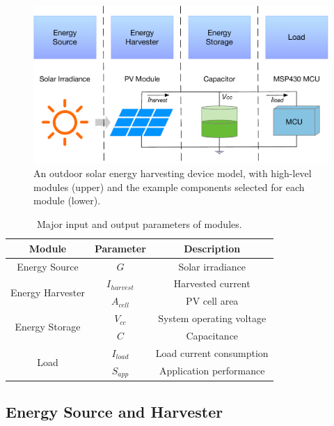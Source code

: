 \begin{figure}[H]
    \centering
    \includegraphics[width=15cm]{figure/work1/framework}
    \caption{An outdoor solar energy harvesting device model, with high-level modules (upper) and the example components selected for each module (lower).}
    \label{Figure:framework}
\end{figure}

\begin{table}[H]
\caption{Major input and output parameters of modules.}
\label{Table:parameter}
\centering
\begin{tabular}{ccc}
\toprule
\textbf{Module}	& \textbf{Parameter} & \textbf{Description} \\
\midrule
Energy Source & $G$ & Solar irradiance \\
\midrule
\multirow{2}{*}{Energy Harvester} & $I_{harvest}$ & Harvested current \\
& $A_{cell}$ & PV cell area \\
\midrule
\multirow{2}{*}{Energy Storage} & $V_{cc}$ & System operating voltage \\
& $C$ & Capacitance \\
\midrule
\multirow{2}{*}{Load} & $I_{load}$ & Load current consumption \\
& $S_{app}$ & Application performance \\
\bottomrule
\end{tabular}
\end{table}

\subsection{Energy Source and Harvester} \label{Section:3.2}

